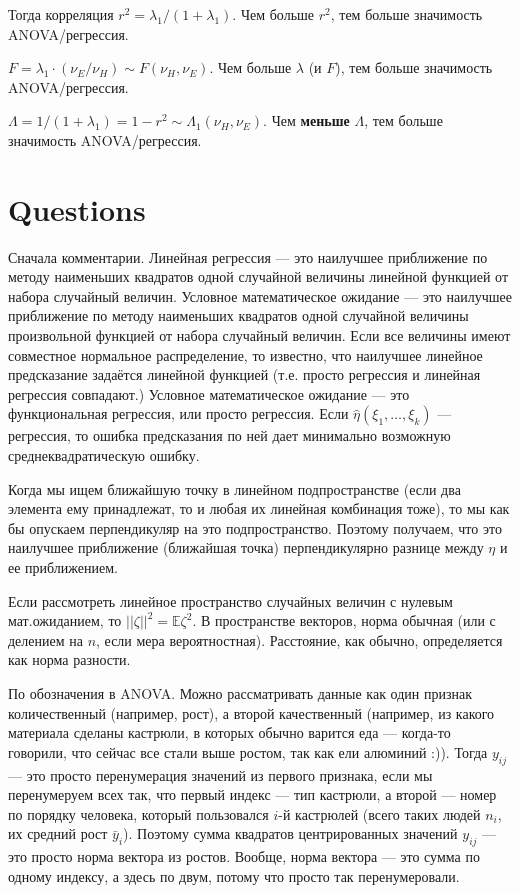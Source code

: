 \documentclass[12 pt]{article}
\def\E{\mathbb{E}}
\begin{document}
Тогда корреляция $r^2 = \lambda_1/(1+\lambda_1)$. Чем больше $r^2$, тем больше значимость ANOVA/регрессия.

$F = \lambda_1  \cdot (\nu_E/\nu_H) \sim F(\nu_H,\nu_E)$. Чем больше $\lambda$ (и $F$),  тем больше значимость ANOVA/регрессия.

$\Lambda = 1/(1+\lambda_1) = 1-r^2 \sim \Lambda_1(\nu_H, \nu_E)$. Чем \textbf{меньше} $\Lambda$,  тем больше значимость ANOVA/регрессия.

\newpage
\section*{Questions}
Сначала комментарии. Линейная регрессия  --- это наилучшее приближение по методу наименьших
квадратов одной случайной величины линейной функцией от набора случайный величин.
Условное математическое ожидание --- это наилучшее приближение по методу наименьших
квадратов одной случайной величины произвольной функцией от набора случайный величин.
Если все величины имеют совместное нормальное распределение, то известно, что наилучшее
линейное предсказание задаётся линейной функцией (т.е. просто регрессия  и линейная регрессия
совпадают.)
Условное математическое ожидание --- это функциональная регрессия, или просто регрессия.
Если $\widehat\eta(\xi_1,\ldots,\xi_k)$ --- регрессия, то ошибка предсказания по ней
дает минимально возможную среднеквадратическую ошибку.

Когда мы ищем ближайшую точку в линейном подпространстве (если два элемента ему принадлежат, то и любая их
линейная комбинация тоже), то мы как бы опускаем перпендикуляр на это подпространство.
Поэтому получаем, что это наилучшее приближение (ближайшая точка) перпендикулярно разнице между
$\eta$ и ее приближением.

Если рассмотреть линейное пространство случайных величин с нулевым мат.ожиданием, то $||\zeta ||^2=\E\zeta^2$.
В пространстве векторов, норма обычная (или с делением на $n$, если мера вероятностная). Расстояние, как обычно,
определяется как норма разности.

По обозначения в ANOVA. Можно рассматривать данные как один признак количественный (например, рост),
а второй качественный (например, из какого материала сделаны кастрюли, в которых обычно варится еда --- когда-то говорили,
что сейчас все стали выше ростом, так как ели алюминий :)).
Тогда $y_{ij}$ --- это просто перенумерация значений из первого признака, если мы перенумеруем всех
так, что первый индекс --- тип кастрюли, а второй --- номер по порядку человека, который пользовался
$i$-й кастрюлей (всего таких людей $n_i$, их средний рост $\bar{y}_i$). Поэтому сумма квадратов центрированных
значений $y_{ij}$ --- это просто норма вектора из ростов. Вообще, норма вектора ---  это сумма по одному индексу,
а здесь по двум, потому что просто так перенумеровали.
\end{document}
